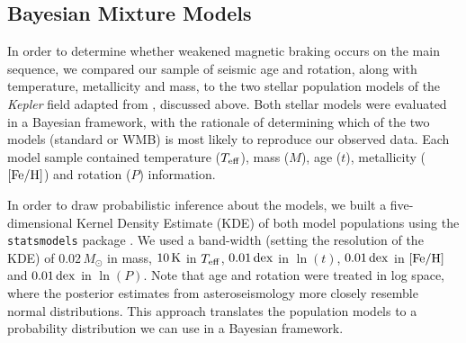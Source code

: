 \documentclass[12pt]{article}
\newcommand{\teff}{\mbox{$T_{\rm eff}$}\xspace}
\newcommand{\kepler}{\emph{Kepler}\xspace}
\begin{document}
\subsection{Bayesian Mixture Models}
In order to determine whether weakened magnetic braking occurs on the main sequence, we compared our sample of seismic age and rotation, along with temperature, metallicity and mass, to the two stellar population models of the \kepler field adapted from \cite{vansaders+2019}, discussed above. Both stellar models were evaluated in a Bayesian framework, with the rationale of determining which of the two models (standard or WMB) is most likely to reproduce our observed data. Each model sample contained temperature (\teff), mass ($M$), age ($t$), metallicity ($\rm{[Fe/H]}$) and rotation ($P$) information.

In order to draw probabilistic inference about the models, we built a five-dimensional Kernel Density Estimate (KDE) of both model populations using the \texttt{statsmodels} package \cite{seabold+perktold2010}. We used a band-width (setting the resolution of the KDE) of $0.02\, M_\odot$ in mass, $10\, \rm K$ in \teff, $0.01\, \rm{dex}$ in $\ln(t)$, $0.01\, \rm{dex}$ in $\rm{[Fe/H]}$ and $0.01\, \rm{dex}$ in $\ln(P)$. Note that age and rotation were treated in log space, where the posterior estimates from asteroseismology more closely resemble normal distributions. This approach translates the population models to a probability distribution we can use in a Bayesian framework.
\end{document}
